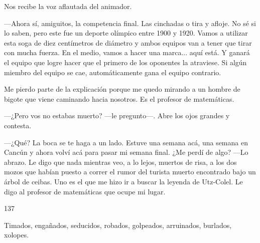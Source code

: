 \documentclass[12pt,twoside,openright,a5paper]{book}
\begin{document}
Nos recibe la voz aflautada del animador.

---Ahora sí, amiguitos, la competencia final. Las cinchadas o tira y afloje. No
sé si lo saben, pero este fue un deporte olímpico entre 1900 y 1920. Vamos a
utilizar esta soga de diez centímetros de diámetro y ambos equipos van a tener que tirar
con mucha fuerza. En el medio, vamos a hacer una marca... aquí está. Y ganará
el equipo que logre hacer que el primero de los oponentes la atraviese. Si
algún miembro del equipo se cae, automáticamente gana el equipo contrario.

Me pierdo parte de la explicación porque me quedo mirando a un
hombre de bigote que viene caminando hacia nosotros. Es el profesor de
matemáticas. 

---¿Pero vos no estabas muerto? ---le pregunto---. Abre los ojos
grandes y contesta. 

---¿Qué? La boca se te haga a un lado. Estuve una semana
acá, una semana en Cancún y ahora volví acá para pasar mi semana final. ¿Me
perdí de algo? ---Lo abrazo. Le digo que nada mientras veo, a lo lejos, muertos de risa,
a los dos mozos que habían puesto a correr el rumor del turista muerto
encontrado bajo un árbol de ceibas. Uno es el que me hizo ir a buscar la
leyenda de Utz-Colel. Le digo al profesor de matemáticas que ocupe mi lugar.

\vspace{0.5cm}

\hrulefill \hspace{0.1cm}\decofourleft\hspace{0.2cm} 137 \hspace{0.2cm}\decofourright \hspace{0.1cm}\hrulefill

\nopagebreak

\vspace{0.5cm}

\nopagebreak

Timados, engañados, seducidos, robados, golpeados, arruinados, burlados, xolopes.

\vspace{0.5cm}


\vspace{0.5cm}
\hrulefill\hspace{0.2cm} \decofourright\decofourleft \hspace{0.2cm} \hrulefill

\cleardoublepage


\end{document}
